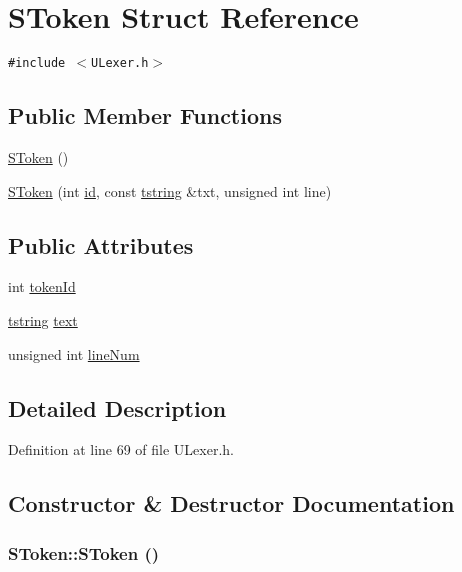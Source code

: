 \hypertarget{struct_s_token}{
\section{SToken Struct Reference}
\label{struct_s_token}
}
{\tt \#include $<$ULexer.h$>$}

\subsection*{Public Member Functions}
\begin{CompactItemize}
\item 
\hyperlink{struct_s_token_c1b82cd1c9d7fa8adde602298b8c6003}{SToken} ()
\item 
\hyperlink{struct_s_token_439c02d6db740f25159368872a3f829f}{SToken} (int \hyperlink{glext__bak_8h_58c2a664503e14ffb8f21012aabff3e9}{id}, const \hyperlink{common__afx_8h_816fa58fd77499b0edb2c69ebe803d5c}{tstring} \&txt, unsigned int line)
\end{CompactItemize}
\subsection*{Public Attributes}
\begin{CompactItemize}
\item 
int \hyperlink{struct_s_token_e0468cab0048129a2a94530c8d17f55a}{tokenId}
\item 
\hyperlink{common__afx_8h_816fa58fd77499b0edb2c69ebe803d5c}{tstring} \hyperlink{struct_s_token_ce9a673e01ca17ce1bceec9a38b7c695}{text}
\item 
unsigned int \hyperlink{struct_s_token_c827f15515a079d2aa999cd0597ea24a}{lineNum}
\end{CompactItemize}


\subsection{Detailed Description}


Definition at line 69 of file ULexer.h.

\subsection{Constructor \& Destructor Documentation}
\hypertarget{struct_s_token_c1b82cd1c9d7fa8adde602298b8c6003}{
\subsubsection[{SToken}]{\setlength{\rightskip}{0pt plus 5cm}SToken::SToken ()}}
\label{struct_s_token_c1b82cd1c9d7fa8adde602298b8c6003}




